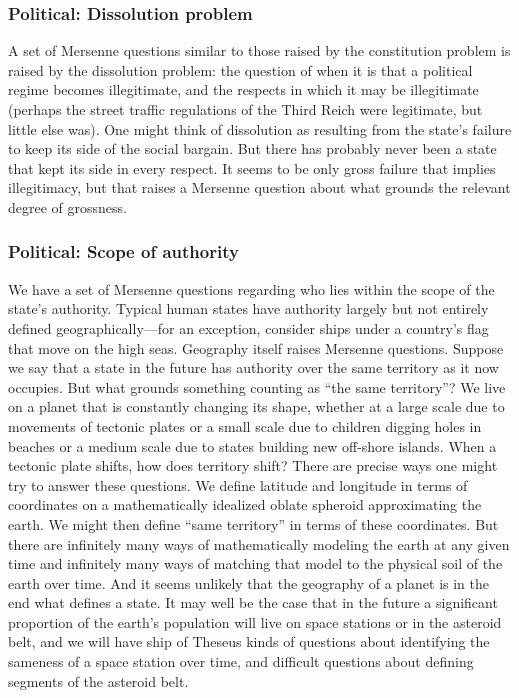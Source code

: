 \subsubsection{Political: Dissolution problem}
A set of Mersenne questions similar to those raised by the constitution problem is raised by the dissolution problem: the question
of when it is that a political regime becomes illegitimate, and the respects in which it may be illegitimate (perhaps the
street traffic regulations of the Third Reich were legitimate, but little else was). One might think of dissolution as resulting from the state's failure to
keep its side of the social bargain. But there has probably never been a state that kept its side in every respect. It seems to be only
gross failure that implies illegitimacy, but that raises a Mersenne question about what grounds the relevant degree of grossness.

\subsubsection{Political: Scope of authority}
We have a set of Mersenne questions regarding who lies within the scope of the state's authority. Typical human states
have authority largely but not entirely defined geographically---for an exception, consider ships under a country's flag that
move on the high seas. Geography itself raises Mersenne questions. Suppose we say that a state in the future has authority
over the same territory as it now occupies. But what grounds something counting as ``the same territory''? We live on a planet that is constantly
changing its shape, whether at a large scale due to movements of tectonic plates or a small scale due to children digging holes in beaches or a medium scale due to states building new off-shore islands. When
a tectonic plate shifts, how does territory shift? There are precise ways one might try to answer these questions. We define
latitude and longitude in terms of coordinates on a mathematically idealized oblate spheroid approximating the earth. We might
then define ``same territory'' in terms of these coordinates. But there are infinitely many ways of mathematically modeling the
earth at any given time and infinitely many ways of matching that model to the physical soil of the earth over time.
And it seems unlikely that the geography of a planet is in the end what defines a state. It may well be the case that in the future 
a significant proportion of the earth's population will live on space stations or in the asteroid belt, and we will have ship of Theseus kinds of
questions about identifying the sameness of a space station over time, and difficult questions about defining segments of the asteroid
belt. 

